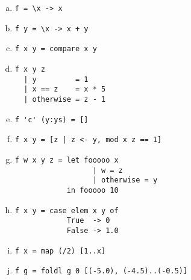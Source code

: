 \documentclass{article}
\begin{document}
\begin{enumerate} [a)]
    \item \begin{verbatim}
f = \x -> x
          \end{verbatim}
    \item \begin{verbatim}
f y = \x -> x + y
          \end{verbatim}
    \item \begin{verbatim}
f x y = compare x y
          \end{verbatim}
    \item \begin{verbatim}
f x y z
  | y         = 1
  | x == z    = x * 5
  | otherwise = z - 1
          \end{verbatim}
    \item \begin{verbatim}
f 'c' (y:ys) = []
          \end{verbatim}
    \item \begin{verbatim}
f x y = [z | z <- y, mod x z == 1]
          \end{verbatim}
    \item \begin{verbatim}
f w x y z = let fooooo x
                  | w = z
                  | otherwise = y
            in fooooo 10
          \end{verbatim}
    \item \begin{verbatim}
f x y = case elem x y of
            True  -> 0
            False -> 1.0
          \end{verbatim}
    \item \begin{verbatim}
f x = map (/2) [1..x]
          \end{verbatim}
    \item \begin{verbatim}
f g = foldl g 0 [(-5.0), (-4.5)..(-0.5)]
          \end{verbatim}

\end{enumerate}
\end{document}
